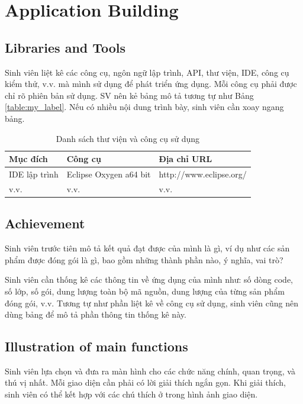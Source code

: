\documentclass[../Main.tex]{subfiles}
\begin{document}
\iffalse
\section{Application Building}
\subsection{Libraries and Tools}
Sinh viên liệt kê các công cụ, ngôn ngữ lập trình, API, thư viện, IDE, công cụ kiểm thử, v.v. mà mình sử dụng để phát triển ứng dụng. Mỗi công cụ phải được chỉ rõ phiên bản sử dụng. SV nên kẻ bảng mô tả tương tự như Bảng \ref{table:my_label}. Nếu có nhiều nội dung trình bày, sinh viên cần xoay ngang bảng.

\begin{table}[H]
\centering{}
    \begin{tabular}{lll}
        \hline
        \textbf{Mục đích} & \textbf{Công cụ}       & \textbf{Địa chỉ URL}    \\ \hline
        IDE lập trình     & Eclipse Oxygen a64 bit & http://www.eclipse.org/ \\ \hline
        v.v.              & v.v.                   & v.v.                    \\ \hline
        \end{tabular}
    \caption{Danh sách thư viện và công cụ sử dụng}
    \label{fig:my_label}
\end{table}

\subsection{Achievement}
Sinh viên trước tiên mô tả kết quả đạt được của mình là gì, ví dụ như các sản phẩm được đóng gói là gì, bao gồm những thành phần nào, ý nghĩa, vai trò?

Sinh viên cần thống kê các thông tin về ứng dụng của mình như: số dòng code, số lớp, số gói, dung lượng toàn bộ mã nguồn, dung lượng của từng sản phẩm đóng gói, v.v. Tương tự như phần liệt kê về công cụ sử dụng, sinh viên cũng nên dùng bảng để mô tả phần thông tin thống kê này.

\subsection{Illustration of main functions}
Sinh viên lựa chọn và đưa ra màn hình cho các chức năng chính, quan trọng, và thú vị nhất. Mỗi giao diện cần phải có lời giải thích ngắn gọn. Khi giải thích, sinh viên có thể kết hợp với các chú thích ở trong hình ảnh giao diện.
\end{document}
